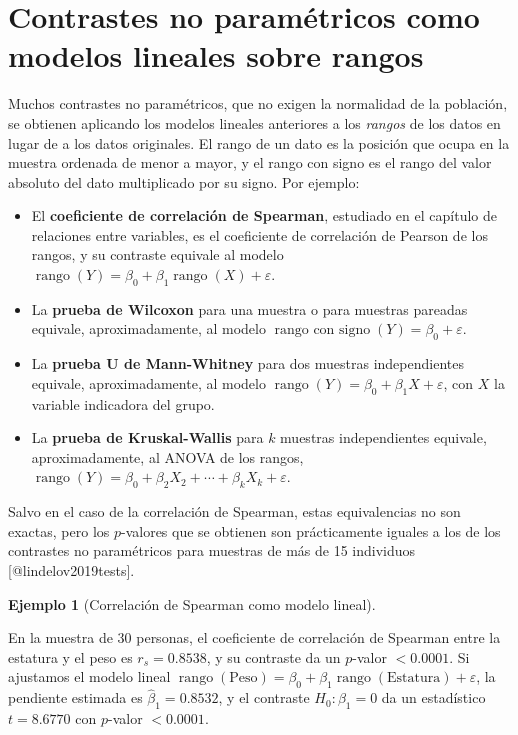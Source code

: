\documentclass[
  spanish,
  a4paper,
]{scrreport}
\providecommand{\tightlist}{%
  \setlength{\itemsep}{0pt}\setlength{\parskip}{0pt}}
\theoremstyle{plain}
\theoremstyle{definition}
\newtheorem{example}{Ejemplo}[chapter]
\theoremstyle{definition}
\theoremstyle{remark}
\begin{document}
\section{Contrastes no paramétricos como modelos lineales sobre
rangos}\label{contrastes-no-paramuxe9tricos-como-modelos-lineales-sobre-rangos}

Muchos contrastes no paramétricos, que no exigen la normalidad de la
población, se obtienen aplicando los modelos lineales anteriores a los
\emph{rangos} de los datos en lugar de a los datos originales. El rango
de un dato es la posición que ocupa en la muestra ordenada de menor a
mayor, y el rango con signo es el rango del valor absoluto del dato
multiplicado por su signo. Por ejemplo:

\begin{itemize}
\tightlist
\item
  El \textbf{coeficiente de correlación de Spearman}, estudiado en el
  capítulo de relaciones entre variables, es el coeficiente de
  correlación de Pearson de los rangos, y su contraste equivale al
  modelo
  \(\operatorname{rango}(Y) = \beta_0 + \beta_1 \operatorname{rango}(X) + \varepsilon\).
\item
  La \textbf{prueba de Wilcoxon} para una muestra o para muestras
  pareadas equivale, aproximadamente, al modelo
  \(\operatorname{rango\ con\ signo}(Y) = \beta_0 + \varepsilon\).
\item
  La \textbf{prueba U de Mann-Whitney} para dos muestras independientes
  equivale, aproximadamente, al modelo
  \(\operatorname{rango}(Y) = \beta_0 + \beta_1 X + \varepsilon\), con
  \(X\) la variable indicadora del grupo.
\item
  La \textbf{prueba de Kruskal-Wallis} para \(k\) muestras
  independientes equivale, aproximadamente, al ANOVA de los rangos,
  \(\operatorname{rango}(Y) = \beta_0 + \beta_2X_2 + \cdots + \beta_kX_k + \varepsilon\).
\end{itemize}

Salvo en el caso de la correlación de Spearman, estas equivalencias no
son exactas, pero los \(p\)-valores que se obtienen son prácticamente
iguales a los de los contrastes no paramétricos para muestras de más de
15 individuos {[}@lindelov2019tests{]}.

\begin{example}[Correlación de Spearman como modelo
lineal]\protect\hypertarget{exm-spearman-modelo-lineal}{}\label{exm-spearman-modelo-lineal}

En la muestra de 30 personas, el coeficiente de correlación de Spearman
entre la estatura y el peso es \(r_s=0.8538\), y su contraste da un
\(p\)-valor \(< 0.0001\). Si ajustamos el modelo lineal
\(\operatorname{rango}(\text{Peso}) = \beta_0 + \beta_1\operatorname{rango}(\text{Estatura}) + \varepsilon\),
la pendiente estimada es \(\hat\beta_1=0.8532\), y el contraste
\(H_0:\beta_1=0\) da un estadístico \(t=8.6770\) con \(p\)-valor
\(< 0.0001\).

\end{example}
\end{document}
